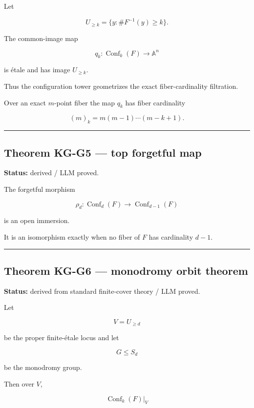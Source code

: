 Let

\[
U_{\ge k}
=
\{y:\#F^{-1}(y)\ge k\}.
\]

The common-image map

\[
q_k:\operatorname{Conf}_k(F)\to\mathbb A^n
\]

is étale and has image \(U_{\ge k}\).

Thus the configuration tower geometrizes the exact fiber-cardinality
filtration.

Over an exact \(m\)-point fiber the map \(q_k\) has fiber cardinality

\[
(m)_k=m(m-1)\cdots(m-k+1).
\]

\begin{center}\rule{0.5\linewidth}{0.5pt}\end{center}

\subsection{Theorem KG-G5 --- top forgetful
map}\label{theorem-kg-g5-top-forgetful-map}

\textbf{Status:} derived / LLM proved.

The forgetful morphism

\[
\rho_d:
\operatorname{Conf}_d(F)\longrightarrow
\operatorname{Conf}_{d-1}(F)
\]

is an open immersion.

It is an isomorphism exactly when no fiber of \(F\) has cardinality
\(d-1\).

\begin{center}\rule{0.5\linewidth}{0.5pt}\end{center}

\subsection{Theorem KG-G6 --- monodromy orbit
theorem}\label{theorem-kg-g6-monodromy-orbit-theorem}

\textbf{Status:} derived from standard finite-cover theory / LLM proved.

Let

\[
V=U_{\ge d}
\]

be the proper finite-étale locus and let

\[
G\le S_d
\]

be the monodromy group.

Then over \(V\),

\[
\operatorname{Conf}_k(F)|_V
\]

